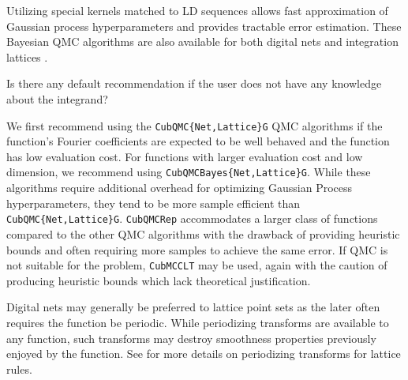 \documentclass{article}[12pt]
\newcommand{\JRComment}[1]{{\color{violet}#1}}
\begin{document}
\begin{description}
    Utilizing special kernels matched to LD sequences allows fast approximation of Gaussian process hyperparameters and provides tractable error estimation. These Bayesian QMC algorithms are also available for both digital nets \cite{JagThesis19a} and integration lattices  \cite{cubqmcbayeslattice}. 
\end{description}

\JRComment{Is there any default recommendation if the user does not have any knowledge about the integrand?}

We first recommend using the  \texttt{CubQMC\{Net,Lattice\}G} QMC algorithms if the function's Fourier coefficients are expected to be well behaved and the function has low evaluation cost. For functions with larger evaluation cost and low dimension, we recommend using  \texttt{CubQMCBayes\{Net,Lattice\}G}. While these algorithms require additional overhead for optimizing Gaussian Process hyperparameters, they tend to be more sample efficient than \texttt{CubQMC\{Net,Lattice\}G}. \texttt{CubQMCRep} accommodates a larger class of functions compared to the other QMC algorithms with the drawback of providing heuristic bounds and often requiring more samples to achieve the same error. If QMC is not suitable for the problem, \texttt{CubMCCLT} may be used, again with the caution of producing heuristic bounds which lack theoretical justification.

Digital nets may generally be preferred to lattice point sets as the later often requires the function be periodic. While periodizing transforms are available to any function, such transforms may destroy smoothness properties previously enjoyed by the function. See \cite[Chapter 16]{mcbook} for more details on periodizing transforms for lattice rules.

\end{document}
